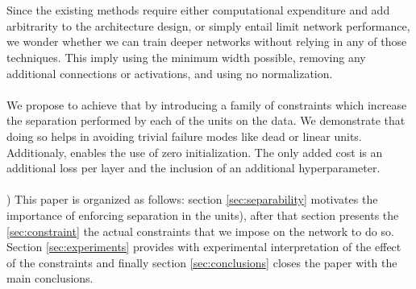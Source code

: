\\\\
Since the existing methods require either computational expenditure and add arbitrarity to the architecture design, or simply entail limit network performance, we wonder whether we can train deeper networks without relying in any of those techniques. This imply using the minimum width possible, removing any additional connections or activations, and using no normalization. 
\\\\
We propose to achieve that by introducing a family of constraints which increase the separation performed by each of the units on the data. We demonstrate that doing so helps in avoiding trivial failure modes like dead or linear units. Additionaly, enables the use of zero initialization. The only added cost is an additional loss per layer and the inclusion of an additional hyperparameter. 
\\\\)
This paper is organized as follows: section \ref{sec:separability} motivates the importance of enforcing separation in the units), after that section presents the \ref{sec:constraint} the actual constraints that we impose on the network to do so. Section \ref{sec:experiments} provides with experimental interpretation of the effect of the constraints and finally section \ref{sec:conclusions} closes the paper with the main conclusions.
